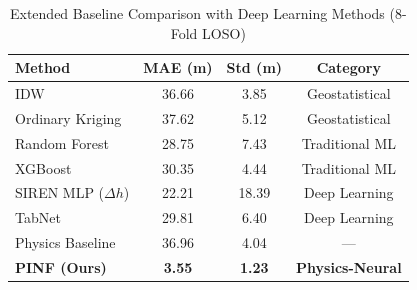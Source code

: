 \begin{table}[h]
\centering
\caption{Extended Baseline Comparison with Deep Learning Methods (8-Fold LOSO)}
\begin{tabular}{lccc}
\toprule
\textbf{Method} & \textbf{MAE (m)} & \textbf{Std (m)} & \textbf{Category} \\
\midrule
IDW \cite{shepard1968two} & 36.66 & 3.85 & Geostatistical \\
Ordinary Kriging \cite{cressie1993statistics} & 37.62 & 5.12 & Geostatistical \\
Random Forest \cite{breiman2001random} & 28.75 & 7.43 & Traditional ML \\
XGBoost \cite{chen2016xgboost} & 30.35 & 4.44 & Traditional ML \\
\midrule
SIREN MLP ($\Delta h$) \cite{sitzmann2020implicit} & 22.21 & 18.39 & Deep Learning \\
TabNet \cite{arik2021tabnet} & 29.81 & 6.40 & Deep Learning \\
\midrule
Physics Baseline & 36.96 & 4.04 & --- \\
\midrule
\textbf{PINF (Ours)} & \textbf{3.55} & \textbf{1.23} & \textbf{Physics-Neural} \\
\bottomrule
\end{tabular}
\end{table}


